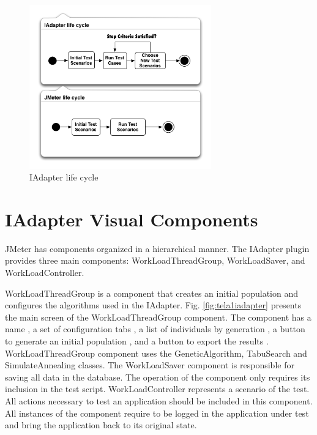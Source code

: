 \documentclass[espaco=umemeio,chapter=TITLE,twoside,openright]{abnt}
\begin{document}
\begin{figure}[h]
\centering
\includegraphics[width=0.7\textwidth]{./images/lifecycle2.png}
\caption{IAdapter life cycle}
\label{fig:iadapterlifecycle}
\end{figure}


\section{IAdapter Visual Components}

JMeter has components organized  in a hierarchical manner. The IAdapter plugin provides three main components: WorkLoadThreadGroup, WorkLoadSaver, and WorkLoadController.

WorkLoadThreadGroup is a component that creates an initial population and configures the algorithms used in the IAdapter. Fig. \ref{fig:tela1iadapter} presents the main screen of the WorkLoadThreadGroup component. The component has a name , a set of configuration tabs , a list of individuals by generation , a button to generate an initial population , and a button to export the results . WorkLoadThreadGroup component uses the GeneticAlgorithm, TabuSearch and SimulateAnnealing classes.  The WorkLoadSaver component is responsible for saving all data in the database. The operation of the component only requires its inclusion in the test script. WorkLoadController represents a scenario of the test. All actions necessary to test an application should be included in this component. All instances of the component require to be logged in the application under test and bring the application back to its original state.
\end{document}
